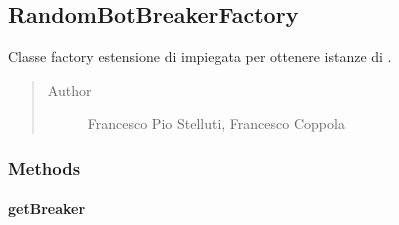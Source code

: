 \documentclass[letterpaper,10pt,italian]{sphinxmanual}
\begin{document}
\subsection{RandomBotBreakerFactory}
\label{\detokenize{source/it/unicam/cs/pa/mastermind/factories/RandomBotBreakerFactory:randombotbreakerfactory}}\label{\detokenize{source/it/unicam/cs/pa/mastermind/factories/RandomBotBreakerFactory::doc}}

\begin{fulllineitems}
\label{\detokenize{source/it/unicam/cs/pa/mastermind/factories/RandomBotBreakerFactory:it.unicam.cs.pa.mastermind.factories.RandomBotBreakerFactory}}
Classe factory estensione di  impiegata per ottenere istanze di .
\begin{quote}\begin{description}
\item[{Author}] \leavevmode
Francesco Pio Stelluti, Francesco Coppola

\end{description}\end{quote}

\end{fulllineitems}



\subsubsection{Methods}
\label{\detokenize{source/it/unicam/cs/pa/mastermind/factories/RandomBotBreakerFactory:methods}}

\paragraph{getBreaker}
\label{\detokenize{source/it/unicam/cs/pa/mastermind/factories/RandomBotBreakerFactory:getbreaker}}

\begin{fulllineitems}
\label{\detokenize{source/it/unicam/cs/pa/mastermind/factories/RandomBotBreakerFactory:it.unicam.cs.pa.mastermind.factories.RandomBotBreakerFactory.getBreaker()}}
\end{fulllineitems}
\end{document}
